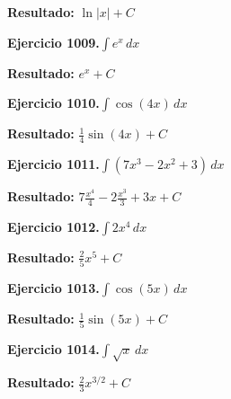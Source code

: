 \documentclass[10pt,a4paper]{article}
\begin{document}
\begin{solbox}
\textbf{Resultado:} \(\displaystyle \ln|x| + C\)
\end{solbox}

\newpage
\begin{ejbox}
\textbf{Ejercicio 1009.}\quad $\int e^x\,dx$
\end{ejbox}

\begin{solbox}
\textbf{Resultado:} \(\displaystyle e^x + C\)
\end{solbox}

\begin{ejbox}
\textbf{Ejercicio 1010.}\quad $\int \cos(4x)\,dx$
\end{ejbox}

\begin{solbox}
\textbf{Resultado:} \(\displaystyle \frac{1}{4}\sin(4x) + C\)
\end{solbox}

\begin{ejbox}
\textbf{Ejercicio 1011.}\quad $\int (7x^3 -2x^2 +3)\,dx$
\end{ejbox}

\begin{solbox}
\textbf{Resultado:} \(\displaystyle 7\frac{x^4}{4} -2\frac{x^3}{3} +3x + C\)
\end{solbox}

\newpage
\begin{ejbox}
\textbf{Ejercicio 1012.}\quad $\int 2x^{4}\,dx$
\end{ejbox}

\begin{solbox}
\textbf{Resultado:} \(\displaystyle \frac{2}{5}x^{5} + C\)
\end{solbox}

\begin{ejbox}
\textbf{Ejercicio 1013.}\quad $\int \cos(5x)\,dx$
\end{ejbox}

\begin{solbox}
\textbf{Resultado:} \(\displaystyle \frac{1}{5}\sin(5x) + C\)
\end{solbox}

\begin{ejbox}
\textbf{Ejercicio 1014.}\quad $\int \sqrt{x}\,dx$
\end{ejbox}

\begin{solbox}
\textbf{Resultado:} \(\displaystyle \frac{2}{3}x^{3/2} + C\)
\end{solbox}
\end{document}
